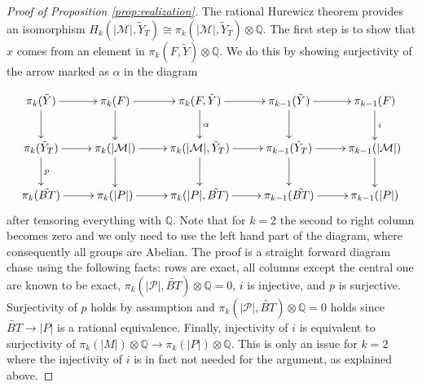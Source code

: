 \documentclass[12pt,a4paper]{article}
\theoremstyle{definition}
\begin{document}
\begin{proof}[Proof of Proposition \ref{prop:realization}]
The rational Hurewicz theorem provides an isomorphism $H_k(\vert \mathcal{M}\vert,\tilde{Y}_T)\cong\pi_k(\vert\mathcal{M}\vert,\tilde{Y}_T)\otimes \mathbb{Q}$. The first step is to show that $x$ comes from an element in $\pi_k(F,\tilde{Y})\otimes \mathbb{Q}$. We do this by showing surjectivity of the arrow marked as $\alpha$ in the diagram

\[\xymatrix{
\pi_k(\tilde{Y})\ar[d]\ar[r] &\pi_k(F)\ar[d]\ar[r]& \pi_k(F,\tilde{Y})\ar[d]^{\alpha}\ar[r] &\pi_{k-1}(\tilde{Y})\ar[d]\ar[r]&\pi_{k-1}(F)\ar[d]^{i}\\
\pi_k(\tilde{Y}_T)\ar[d]^{p}\ar[r]& \pi_k(\vert \mathcal{M}\vert)\ar[d]\ar[r]& \pi_k(\vert \mathcal{M}\vert,\tilde{Y}_T)\ar[d]\ar[r] &\pi_{k-1}(\tilde{Y}_T)\ar[d]\ar[r]&\pi_{k-1}(\vert \mathcal{M}\vert)\ar[d]\\
\pi_k(\tilde{BT})\ar[r]& \pi_k(\vert {P}\vert)\ar[r]& \pi_k(\vert {P}\vert,\tilde{BT})\ar[r] &\pi_{k-1}(\tilde{BT})\ar[r]&\pi_{k-1}(\vert {P}\vert)\\
}\]
after tensoring everything with $\mathbb{Q}$. Note that for $k=2$ the second to right column becomes zero and we only need to use the left hand part of the diagram, where consequently all groups are Abelian. The proof is a straight forward diagram chase using the following facts: rows are exact, all columns except the central one are known to be exact, $\pi_k(\vert \mathcal{P}\vert,\tilde{BT})\otimes \mathbb{Q}=0$, $i$ is injective, and $p$ is surjective. Surjectivity of $p$ holds by assumption and $\pi_k(\vert \mathcal{P}\vert,\tilde{BT})\otimes \mathbb{Q}=0$ holds since $\tilde{BT}\rightarrow \vert P\vert$ is a rational equivalence. Finally, injectivity of $i$ is equivalent to surjectivity of $\pi_{k}(\vert M\vert)\otimes \mathbb{Q}\rightarrow \pi_{k}(\vert P\vert)\otimes \mathbb{Q}$. This is only an issue for $k=2$ where the injectivity of $i$  is in fact not needed for the argument, as explained above.
 

\end{proof}
\end{document}
